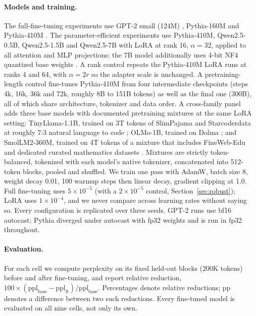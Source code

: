 \documentclass[11pt]{article}
\begin{document}
\paragraph{Models and training.}
The full-fine-tuning experiments use GPT-2 small (124M)
\citep{radford2019language}, Pythia-160M and Pythia-410M
\citep{biderman2023pythia}. The parameter-efficient experiments use
Pythia-410M, Qwen2.5-0.5B, Qwen2.5-1.5B and Qwen2.5-7B \citep{qwen25} with
LoRA \citep{lora} at rank 16, $\alpha{=}32$, applied to all attention and
MLP projections; the 7B model additionally uses 4-bit NF4 quantized base
weights \citep{qlora}. A rank control repeats the Pythia-410M LoRA runs at
ranks 4 and 64, with $\alpha{=}2r$ so the adapter scale is unchanged. A
pretraining-length control fine-tunes Pythia-410M from four intermediate
checkpoints (steps 4k, 16k, 36k and 72k, roughly 8B to 151B tokens) as well
as the final one (300B), all of which share architecture, tokenizer and data
order. A cross-family panel adds three base models with documented
pretraining mixtures at the same LoRA setting: TinyLlama-1.1B, trained on 3T
tokens of SlimPajama and Starcoderdata at roughly 7:3 natural language to
code \citep{zhang2024tinyllama}; OLMo-1B, trained on Dolma
\citep{groeneveld2024olmo,soldaini2024dolma}; and SmolLM2-360M, trained on 4T
tokens of a mixture that includes FineWeb-Edu and dedicated curated
mathematics datasets \citep{allal2025smollm2}. Mixtures are strictly token-balanced, tokenized with
each model's native tokenizer, concatenated into 512-token blocks, pooled
and shuffled. We train one pass with AdamW, batch size 8, weight decay 0.01,
100 warmup steps then linear decay, gradient clipping at 1.0. Full
fine-tuning uses $5\times10^{-5}$ (with a $2\times10^{-5}$ control,
Section~\ref{sec:robust}); LoRA uses $1\times10^{-4}$, and we never compare
across learning rates without saying so. Every configuration is replicated
over three seeds. GPT-2 runs use bf16 autocast; Pythia diverged under
autocast with fp32 weights and is run in fp32 throughout.

\paragraph{Evaluation.}
For each cell we compute perplexity on its fixed held-out blocks (200K
tokens) before and after fine-tuning, and report relative reduction,
$100\times(\mathrm{ppl}_{\text{base}}-\mathrm{ppl}_{\text{ft}})/\mathrm{ppl}_{\text{base}}$.
Percentages denote relative reductions; pp denotes a difference between two
such reductions. Every fine-tuned model is evaluated on all nine cells, not
only its own.
\end{document}

